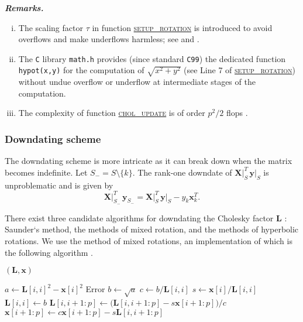 \documentclass[a4paper,oneside,11pt,DIV=12]{scrartcl}
\newcommand{\code}[1]{{\texttt{#1}}}
\begin{document}
\vspace{1em}
\noindent\textbf{\sffamily \small \itshape Remarks.}
\vspace{-0.5em}
\begin{enumerate}[i)]
	\item The scaling factor $\tau$ in function
		\hyperlink{alg:setuprotation}{\textsc{setup\_rotation}} is
		introduced to avoid overflows and make underflows harmless; see
		\citet[][p. 273]{stewart_1998} and
		\citet[][Chap. 5.1.8]{golub_loan_1996}.
	\item The \code{C} library \code{math.h} provides (since standard
		\code{C99}) the dedicated function \code{hypot(x,y)} for the
		computation of $\sqrt{x^2 + y^2}$ (see Line 7 of
		\hyperlink{alg:setuprotation}{\textsc{setup\_rotation}}) without
		undue overflow or underflow at intermediate stages of the computation.
	\item The complexity of function
		\hyperlink{alg:cholupdate}{\textsc{chol\_update}} is of order
		$p^2/2$ flops \citep[][p. 340]{stewart_1998}.
\end{enumerate}

\subsubsection{Downdating scheme}
The downdating scheme is more intricate as it can break down when the
matrix becomes indefinite. Let $S_{-} = S \setminus \{k\}$. The rank-one
downdate of $\bm X\vert_S^T \, \bm y\vert_S$ is unproblematic and is given by
\begin{equation}\label{eq:xtydowndate}
 	\bm X\vert_{S_-}^T \, \bm y_{S_-} = \bm X\vert_{S}^T \,
		\bm y \vert_S - y_k \bm x_k^T.
\end{equation}

There exist three candidate algorithms for downdating the Cholesky
factor $\bm L$ \citep[][p. 355]{stewart_1998}: Saunder`s method, the
methods of mixed rotation, and the methods of hyperbolic rotations. We
use the method of mixed rotations, an implementation of which is the
following algorithm \citep[][Algorithm 3.9]{stewart_1998}.
\begin{algorithmic}[1]
	\hypertarget{alg:choldowndate}{$(\bm L, \bm x)$}
		\State $a \gets \bm L[i,i]^2 - \bm x[i]^2$
			\State \Return Error
		\Else
			\State $b \gets \sqrt{a}$
		\EndIf
		\State $c \gets b/\bm L[i,i]$
		\State $s \gets \bm x[i] / \bm L[i,i]$
		\State $\bm L[i,i] \gets b$
		\State $\bm L[i, i+1:p] \gets \big( \bm L[i, i+1:p] -
			s \bm x[i+1:p]\big) / c$
		\State $\bm x[i+1:p] \gets c \bm x[i+1:p] - s \bm L[i, i+1:p]$
	\EndFor
	\EndFunction
\end{algorithmic}
\end{document}
